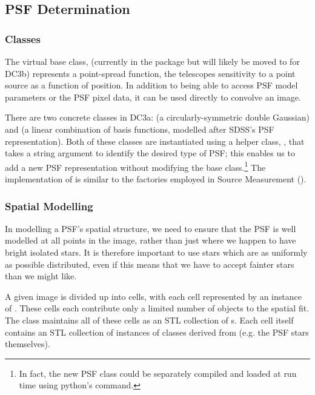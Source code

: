 
\subsection{PSF Determination}
\label{secPsf}

\subsubsection{Classes}

The virtual base class,  (currently in the
 package but will likely be moved 
to  for DC3b) represents a point-spread function, the
telescopes sensitivity to a point source as a function of position.  
In addition to being able to access PSF model parameters or the PSF
pixel data, it can be used directly to convolve an image.  

There are two concrete  classes in DC3a:  (a circularly-symmetric double Gaussian) and
 (a linear combination of basis functions, modelled after SDSS's PSF representation).  Both of these
classes are instantiated using a helper class, , that takes a string argument to identify the desired
type of PSF; this enables us to add a new PSF representation without modifying the base class.\footnote{In fact, the new
  PSF class could be separately compiled and loaded at run time using python's  command.}  The implementation of  is similar to the factories employed in Source Measurement ().

\subsubsection{Spatial Modelling}

In modelling a PSF's spatial structure, we need to ensure that the PSF is well modelled at all
points in the image, rather than just where we happen to have bright isolated stars.  It is
therefore important to use stars which are as uniformly as possible distributed, even if this
means that we have to accept fainter stars than we might like.

A given image is divided up into cells, with each cell represented by an instance of . These cells
each contribute only a limited number of objects to the spatial fit.  The  class maintains all of
these cells as an STL collection of s.  Each cell itself contains an STL collection of instances of
classes derived from  (e.g. the PSF stars themselves).

